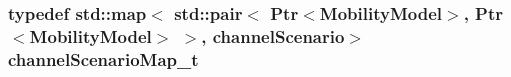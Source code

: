 \subsubsection[{\texorpdfstring{channel\+Scenario\+Map\+\_\+t}{channelScenarioMap_t}}]{\setlength{\rightskip}{0pt plus 5cm}typedef std\+::map$<$ std\+::pair$<$ {\bf Ptr}$<${\bf Mobility\+Model}$>$, {\bf Ptr}$<${\bf Mobility\+Model}$>$ $>$, {\bf channel\+Scenario}$>$ {\bf channel\+Scenario\+Map\+\_\+t}}\hypertarget{mmwave-propagation-loss-model_8h_a33be62e54e7d66f3d40b8806e882a4b0}{}\label{mmwave-propagation-loss-model_8h_a33be62e54e7d66f3d40b8806e882a4b0}

